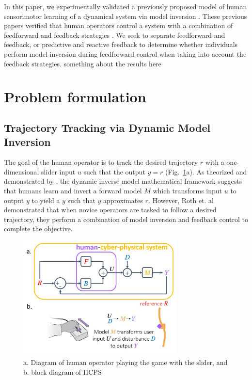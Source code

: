 \documentclass{ifacconf}
\begin{document}
In this paper, we experimentally validated a previously proposed model of human sensorimotor learning of a dynamical system via model inversion \cite{roth2017toward, robinson2016dynamic}. These previous papers verified that human operators control a system with a combination of feedforward and feedback strategies \cite{roth2017toward}. We seek to separate feedforward and feedback, or predictive and reactive feedback to determine whether individuals perform model inversion during feedforward control when taking into account the feedback strategies. something about the results here

\section{Problem formulation}

\subsection{Trajectory Tracking via Dynamic Model Inversion}

The goal of the human operator is to track the desired trajectory $r$ with a one-dimensional slider input $u$ such that the output $y=r$ (Fig.~\ref{fig:game}a). As theorized and demonstrated by \cite{robinson2016dynamic, roth2017toward}, the dynamic inverse model mathematical framework suggests that humans learn and invert a forward model $M$ which transforms input $u$ to output $y$ to yield a $y$ such that $y$ approximates $r$. However, Roth et. al demonstrated that when novice operators are tasked to follow a desired trajectory, they perform a combination of model inversion and feedback control to complete the objective. 

\begin{figure}[h]
\begin{center}
\includegraphics[width=8.4cm]{game.jpg}    %
\caption{a. Diagram of human operator playing the game with the slider, and b. block diagram of HCPS} 
\label{fig:game}
\end{center}
\end{figure}
\end{document}
